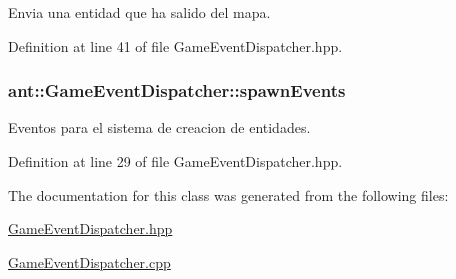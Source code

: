Envia una entidad que ha salido del mapa. 



Definition at line 41 of file Game\+Event\+Dispatcher.\+hpp.

\hypertarget{classant_1_1_game_event_dispatcher_a18ce79039513ba4a440bf0f16862932b}{
\subsubsection[{spawn\+Events}]{ ant\+::\+Game\+Event\+Dispatcher\+::spawn\+Events}}\label{classant_1_1_game_event_dispatcher_a18ce79039513ba4a440bf0f16862932b}


Eventos para el sistema de creacion de entidades. 



Definition at line 29 of file Game\+Event\+Dispatcher.\+hpp.



The documentation for this class was generated from the following files\+:\begin{DoxyCompactItemize}
\item 
\hyperlink{_game_event_dispatcher_8hpp}{Game\+Event\+Dispatcher.\+hpp}\item 
\hyperlink{_game_event_dispatcher_8cpp}{Game\+Event\+Dispatcher.\+cpp}\end{DoxyCompactItemize}
